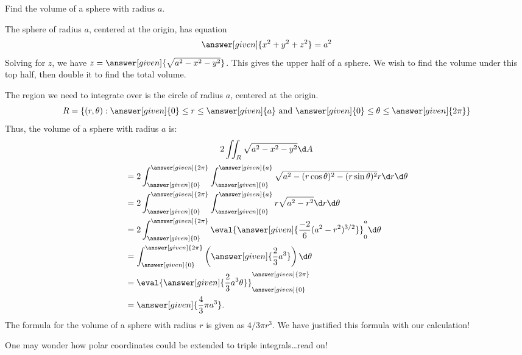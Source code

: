 \documentclass{ximera}
\begin{document}
\begin{example}
  Find the volume of a sphere with radius $a$.
  \begin{explanation}
    The sphere of radius $a$, centered at the origin, has equation
    \[
    \answer[given]{x^2+y^2+z^2}=a^2
    \]
    Solving for $z$, we have
    $z=\answer[given]{\sqrt{a^2-x^2-y^2}}$. This gives the upper half
    of a sphere. We wish to find the volume under this top half, then
    double it to find the total volume.

    The region we need to integrate over is the circle of radius $a$,
    centered at the origin.
    \[
    R =\{(r,\theta):\text{$\answer[given]{0}\leq r\leq \answer[given]{a}$ and  $\answer[given]{0}\leq\theta\leq\answer[given]{2\pi}$}\}
    \]
    Thus, the volume of a sphere with radius $a$ is:
    \[
    2\iint_R\sqrt{a^2-x^2-y^2}\d A
    \]
    \begin{align*}
      &= 2\int_{\answer[given]{0}}^{\answer[given]{2\pi}}\int_{\answer[given]{0}}^{\answer[given]{a}}\sqrt{a^2-(r\cos\theta)^2-(r\sin\theta)^2}r\d r\d\theta\\
      &=2\int_{\answer[given]{0}}^{\answer[given]{2\pi}}\int_{\answer[given]{0}}^{\answer[given]{a}}r\sqrt{a^2-r^2}\d r\d\theta\\
      &=2\int_{\answer[given]{0}}^{\answer[given]{2\pi}}\eval{\answer[given]{\frac{-2}{6}(a^2-r^2)^{3/2}}}_{0}^a \d\theta\\
      &= \int_{\answer[given]{0}}^{\answer[given]{2\pi}}\left(\answer[given]{\frac{2}{3}a^3}\right)\d \theta\\
      &=\eval{\answer[given]{\frac{2}{3}a^3\theta}}_{\answer[given]{0}}^{\answer[given]{2\pi}}\\
      &=\answer[given]{\frac{4}{3}\pi a^3}.
    \end{align*}
    The formula for the volume of a sphere with radius $r$ is given as
    $4/3\pi r^3$.  We have justified this formula with our
    calculation!
  \end{explanation}
\end{example}

One may wonder how polar coordinates could be extended to triple integrals\dots read on!
\end{document}
